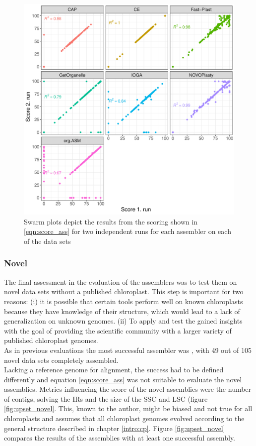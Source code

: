 \begin{figure}[H]
\centering
\includegraphics[height=.49\textheight, width=.95\textwidth]{Figures/repro}
\decoRule
\caption[Comparison between two runs with the same assembler for consistency testing
]{Swarm plots depict the results from the scoring shown in \ref{eqn:score_ass} for two
  independent runs for each assembler on each of the data sets}
\label{fig:consisplot}
\end{figure}


\subsubsection{Novel}
 
The final assessment in the evaluation of the assemblers was to test them on novel data
sets without a published chloroplast. This step is important for two reasons: (i) it is
possible that certain tools perform well on known chloroplasts because they have knowledge
of their structure, which would lead to a lack of generalization on unknown genomes. (ii)
To apply and test the gained insights with the goal of providing
the scientific community with a larger variety of published chloroplast genomes.\\
As in previous evaluations the most successful assembler was \go, with 49 out of 105 novel data sets completely assembled. \\
Lacking a reference genome for alignment, the success had to be defined differently and
equation \ref{eqn:score_ass} was not suitable to evaluate the novel assemblies. Metrics
influencing the score of the novel assemblies were the number of contigs, solving the IRs
and the size of the SSC and LSC (figure \ref{fig:upset_novel}. This, known to the author, might be biased and not true
for all chloroplasts and assumes that all chloroplast genomes evolved according to the
general structure described in chapter \ref{intro:cp}. Figure \ref{fig:upset_novel}
compares the results of the assemblies with at least one successful assembly.

